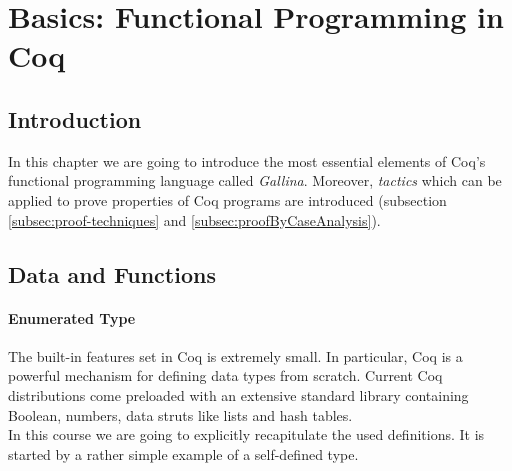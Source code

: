 \section{Basics: Functional Programming in Coq}

	\subsection{Introduction}

	In this chapter we are going to introduce the most essential elements of Coq's functional programming language called {\itshape Gallina}. 
	Moreover, {\itshape tactics} which can be applied to prove properties of Coq programs are introduced (subsection \ref{subsec:proof-techniques} and \ref{subsec:proofByCaseAnalysis}).
	
	\subsection{Data and Functions}
	\label{subSec:DataAndFuctions}
	
	 \paragraph{Enumerated Type}
	 
	 
	  The built-in features set in Coq is extremely small. In particular, Coq is a powerful mechanism for defining data types from scratch.
	  Current Coq distributions come preloaded with an extensive standard library containing Boolean, numbers, data struts like lists and hash tables.\\
	  
	  In this course we are going to explicitly recapitulate the used definitions. 
	  It is started by a rather simple example of a self-defined type.  
	   

